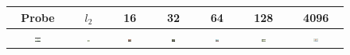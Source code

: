\begin{figure}[t]
    \begin{center}
        \begin{tabular}{c|c|ccccc}
           \hline
            Probe & $l_2$ & 16 & 32 & 64 & 128 & 4096  \\ \hline
           \includegraphics[width=0.1\textwidth]{images/ret_results/diving/probe.png} & \includegraphics[width=0.1\textwidth]{images/ret_results/diving/l2.png} & 
           \includegraphics[width=0.1\textwidth]{images/ret_results/diving/16.png} & 
           \includegraphics[width=0.1\textwidth]{images/ret_results/diving/32.png} & 
           \includegraphics[width=0.1\textwidth]{images/ret_results/diving/64.png} & 
           \includegraphics[width=0.1\textwidth]{images/ret_results/diving/128.png} & 
           \includegraphics[width=0.1\textwidth]{images/ret_results/diving/4096.png} \\

\end{tabular}
\end{center}
\end{figure}
